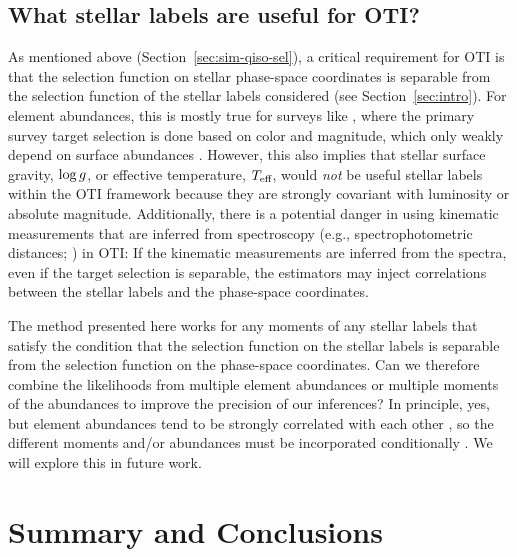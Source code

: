 \documentclass[modern]{aastex631}
\begin{document}
\subsection{What stellar labels are useful for OTI?} \label{sec:disc-what-labels}

As mentioned above (Section~\ref{sec:sim-qiso-sel}), a critical requirement for OTI is
that the selection function on stellar phase-space coordinates is separable from the
selection function of the stellar labels considered (see Section~\ref{sec:intro}).
For element abundances, this is mostly true for surveys like \apogee, where the primary
survey target selection is done based on color and magnitude, which only weakly depend
on surface abundances \citep{Zasowski:2017, Santana:2021, Beaton:2021}.
However, this also implies that stellar surface gravity, $\log g$, or effective
temperature, $T_{\textrm{eff}}$, would \emph{not} be useful stellar labels within the OTI framework
because they are strongly covariant with luminosity or absolute magnitude.
Additionally, there is a potential danger in using kinematic measurements that are
inferred from spectroscopy (e.g., spectrophotometric distances; \citealt{Hogg:2019,
Leung:2019}) in OTI:
If the kinematic measurements are inferred from the spectra, even if the target
selection is separable, the estimators may inject correlations between the stellar
labels and the phase-space coordinates.

The method presented here works for any moments of any stellar labels that satisfy the
condition that the selection function on the stellar labels is separable from the
selection function on the phase-space coordinates.
Can we therefore combine the likelihoods from multiple element abundances or multiple
moments of the abundances to improve the precision of our inferences?
In principle, yes, but element abundances tend to be strongly correlated with each other
\citep[e.g.,][]{Ness:2019, Griffith:2023}, so the different moments and/or abundances
must be incorporated conditionally \citep[e.g.,][]{Ratcliffe:2023}.
We will explore this in future work.


\section{Summary and Conclusions} \label{sec:conclusions}
\end{document}
